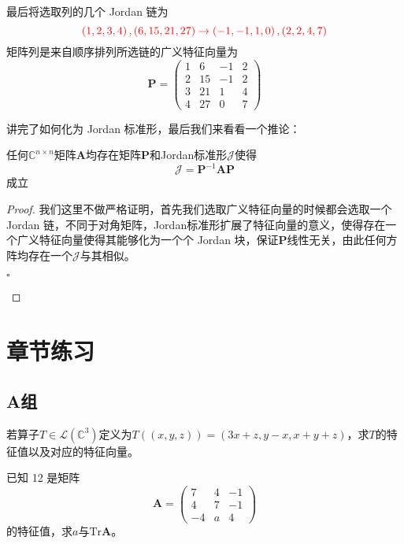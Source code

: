 \begin{example}
最后将选取列的几个 Jordan 链为$$\textcolor{red}{\left( 1,2,3,4 \right),\left( 6,15,21,27 \right) \rightarrow \left( -1,-1,1,0 \right),\left( 2,2,4,7 \right)}$$矩阵列是来自顺序排列所选链的广义特征向量为$$\mathbf{P}=\begin{pmatrix}
	1 & 6 & -1 & 2\\
	2 & 15 & -1 & 2\\
	3 & 21 & 1 & 4\\
	4 & 27 & 0 & 7
	\end{pmatrix}$$
\end{example}

讲完了如何化为 Jordan 标准形，最后我们来看看一个推论：

\begin{corollary}
	任何$\mathbb{C}^{n\times n}$矩阵$\mathbf{A}$均存在矩阵$\mathbf{P}$和Jordan标准形$\mathscr{J}$使得$$\mathscr{J}=\mathbf{P}^{-1}\mathbf{A}\mathbf{P}$$成立
\end{corollary}

\begin{proof}
	我们这里不做严格证明，首先我们选取广义特征向量的时候都会选取一个 Jordan 链，不同于对角矩阵，Jordan标准形扩展了特征向量的意义，使得存在一个广义特征向量使得其能够化为一个个 Jordan 块，保证$\mathbf{P}$线性无关，由此任何方阵均存在一个$\mathscr{J}$与其相似。

	\begin{flushright}
		$\square$
	\end{flushright}
\end{proof}

\section{章节练习}

\subsection{A组}

\begin{reidai}
	若算子$T\in \mathcal{L}(\mathbb{C}^3)$定义为$T((x,y,z))=(3x+z,y-x,x+y+z)$，求$T$的特征值以及对应的特征向量。
\end{reidai}

\begin{reidai}
	已知 12 是矩阵$$\mathbf{A}=\begin{pmatrix}
	7 & 4 & -1\\
	4 & 7 & -1\\
	-4 & a & 4
	\end{pmatrix}$$的特征值，求$a$与$\text{Tr}\mathbf{A}$。
\end{reidai}

